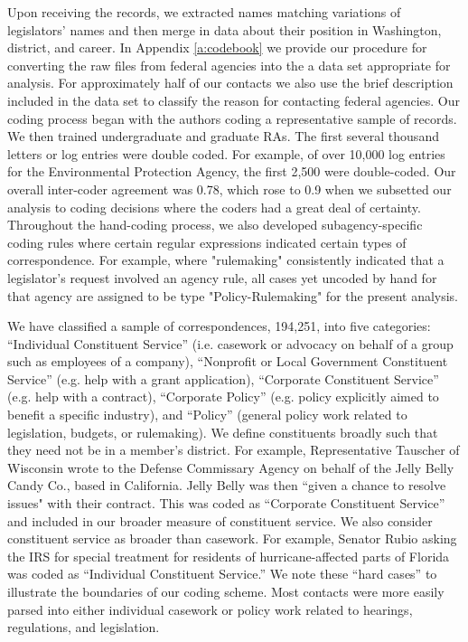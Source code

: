 \documentclass{article}
\begin{document}
Upon receiving the records, we extracted names matching variations of legislators' names and then merge in data about their position in Washington, district, and career.  In Appendix \ref{a:codebook} we provide our procedure for converting the raw files from federal agencies into the a data set appropriate for analysis.  For approximately half of our contacts we also use the brief description included in the data set to classify the reason for contacting federal agencies.   Our coding process began with the authors coding a representative sample of records. We then trained undergraduate and graduate RAs. The first several thousand letters or log entries were double coded. For example, of over 10,000 log entries for the Environmental Protection Agency, the first 2,500 were double-coded.  Our overall inter-coder agreement was 0.78, which rose to 0.9 when we subsetted our analysis to coding decisions where the coders had a great deal of certainty.  Throughout the hand-coding process, we also developed subagency-specific coding rules where certain regular expressions indicated certain types of correspondence. For example, where "rulemaking" consistently indicated that a legislator's request involved an agency rule, all cases yet uncoded by hand for that agency are assigned to be type "Policy-Rulemaking" for the present analysis.    

We have classified a sample of correspondences, 194,251, into five categories: ``Individual Constituent Service'' (i.e. casework or advocacy on behalf of a group such as employees of a company), ``Nonprofit or Local Government Constituent Service'' (e.g. help with a grant application), ``Corporate Constituent Service'' (e.g. help with a contract), ``Corporate Policy'' (e.g. policy explicitly aimed to benefit a specific industry), and ``Policy'' (general policy work related to legislation, budgets, or rulemaking).  We define constituents broadly such that they need not be in a member's district. For example, Representative Tauscher of Wisconsin wrote to the Defense Commissary Agency on behalf of the Jelly Belly Candy Co., based in California. Jelly Belly was then ``given a chance to resolve issues" with their contract. This was coded as ``Corporate Constituent Service'' and included in our broader measure of constituent service.  We also consider constituent service as broader than casework. For example, Senator Rubio asking the IRS for special treatment for residents of hurricane-affected parts of Florida was coded as ``Individual Constituent Service.'' We note these ``hard cases'' to illustrate the boundaries of our coding scheme. Most contacts were more easily parsed into either individual casework or policy work related to hearings, regulations, and legislation.
\end{document}
